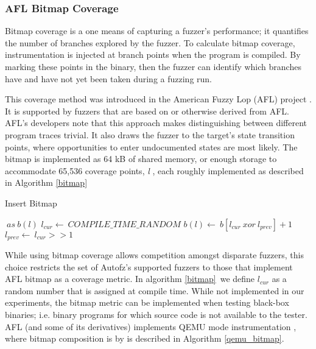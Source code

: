 \subsubsection{AFL Bitmap Coverage}
Bitmap coverage is a one means of capturing a fuzzer's performance; it quantifies the number of
 branches explored by the fuzzer. To calculate bitmap coverage, instrumentation is injected at branch 
 points when the program is compiled. By marking these points in the binary, then the fuzzer can 
 identify which branches have and have not yet been taken during a fuzzing run. 
 \cite{noauthor_afldocstechnical_detailstxt_nodate}

 This coverage method was introduced in the American Fuzzy Lop (AFL) project \cite{noauthor_afldocstechnical_detailstxt_nodate}. 
 It is supported by fuzzers that are based on or otherwise derived from AFL.  AFL's developers 
 note that this approach makes distinguishing between different program traces trivial. It also draws 
 the fuzzer to the target's state transition points, where opportunities to enter undocumented states 
 are most likely. The bitmap is implemented as 64 kB of shared memory, or enough storage to 
 accommodate 65,536 coverage points, \emph{l} \cite{yun_qsym_2018}, each roughly implemented as 
 described in Algorithm \ref{bitmap}

 \begin{algorithm}
    \caption {Insert Bitmap}\label{bitmap}
    \begin{algorithmic}[1]
        $\ as\ b(l)$
            \State $l_{cur} \gets\ COMPILE\_TIME\_RANDOM$
            \State $b(l) \gets\ b[l_{cur}\  xor\  l_{prev}] + 1$
            \State $l_{prev} \gets\ l_{cur} >> 1$
        \EndProcedure
    \end{algorithmic}
\end{algorithm}
 
While using bitmap coverage allows competition amongst disparate fuzzers, this choice restricts the 
set of Autofz's supported fuzzers to those that implement AFL bitmap as a coverage metric. In algorithm 
\ref{bitmap}\, we define \emph{$l_{cur}$} as a random number that is assigned at compile time. While 
not implemented in our experiments, the bitmap metric can be implemented when testing black-box binaries; 
i.e. binary programs for which source code is not available to the tester. AFL (and some of its derivatives)
implements QEMU mode instrumentation \cite{noauthor_aflqemu_mode_nodate}, where bitmap composition is 
by \cite{noauthor_afldocstechnical_detailstxt_nodate} is described in Algorithm \ref{qemu_bitmap}.


